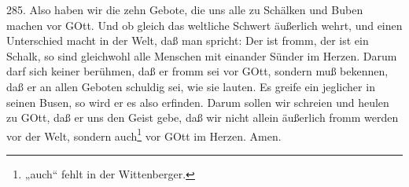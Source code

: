 285. Also haben wir die zehn Gebote, die uns alle zu Schälken und Buben machen vor GOtt. Und ob gleich das weltliche Schwert äußerlich wehrt, und einen Unterschied macht in der Welt, daß man spricht: Der ist fromm, der ist ein Schalk, so sind gleichwohl alle Menschen mit einander Sünder im Herzen. Darum darf sich keiner berühmen, daß er fromm sei vor GOtt, sondern muß bekennen, daß er an allen Geboten schuldig sei, wie sie lauten. Es greife ein jeglicher in seinen Busen, so wird er es also erfinden. Darum sollen wir schreien und heulen zu GOtt, daß er uns den Geist gebe, daß wir nicht allein äußerlich fromm werden vor der Welt, sondern auch\footnote{„auch“ fehlt in der Wittenberger.} vor GOtt im Herzen. Amen.
